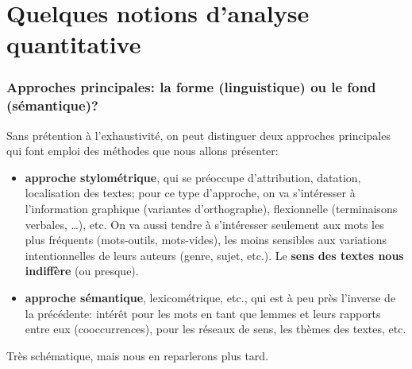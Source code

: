 \documentclass{beamer}
\begin{document}




\section{Quelques notions d'analyse quantitative}

\begin{frame}[fragile]
\frametitle{Approches principales: la forme (linguistique) ou le fond (sémantique)?}

Sans prétention à l'exhaustivité, on peut distinguer deux approches principales qui font emploi des méthodes que nous allons présenter:
\begin{itemize}
	\item \textbf{approche stylométrique}, qui se préoccupe d'attribution, datation, localisation des textes; pour ce type d'approche, on va s'intéresser à l'information graphique (variantes d'orthographe), flexionnelle (terminaisons verbales, …), etc. On va aussi tendre à s'intéresser seulement aux \alert{mots les plus fréquents} (mots-outils, mots-vides), les moins sensibles aux variations intentionnelles de leurs auteurs (genre, sujet, etc.). Le \textbf{sens des textes nous indiffère} (ou presque).
	\item \textbf{approche sémantique}, lexicométrique, etc., qui est à peu près l'inverse de la précédente: intérêt pour les mots en tant que lemmes et leurs rapports entre eux (cooccurrences), pour les réseaux de sens, les thèmes des textes, etc.
\end{itemize}
Très schématique, mais nous en reparlerons plus tard.
\end{frame}






\appendix
\end{document}
